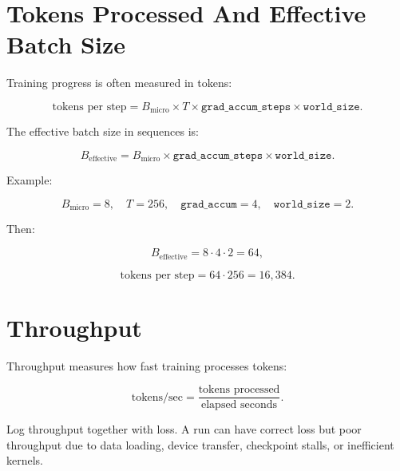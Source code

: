 \section{Tokens Processed And Effective Batch Size}

Training progress is often measured in tokens:

\[
\text{tokens per step}=
B_{\text{micro}}\times T\times \texttt{grad\_accum\_steps}\times \texttt{world\_size}.
\]

The effective batch size in sequences is:

\[
B_{\text{effective}}=
B_{\text{micro}}\times \texttt{grad\_accum\_steps}\times \texttt{world\_size}.
\]

Example:

\[
B_{\text{micro}}=8,\quad T=256,\quad \texttt{grad\_accum}=4,\quad \texttt{world\_size}=2.
\]

Then:

\[
B_{\text{effective}}=8\cdot4\cdot2=64,
\]

\[
\text{tokens per step}=64\cdot256=16{,}384.
\]

\begin{center}
\end{center}

\section{Throughput}

Throughput measures how fast training processes tokens:

\[
\text{tokens/sec}=\frac{\text{tokens processed}}{\text{elapsed seconds}}.
\]

Log throughput together with loss. A run can have correct loss but poor throughput due to data loading, device transfer, checkpoint stalls, or inefficient kernels.

